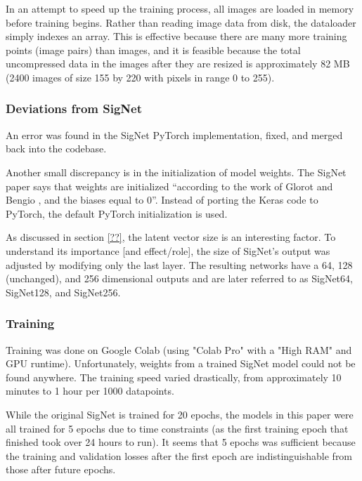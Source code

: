 In an attempt to speed up the training process, all images are loaded in memory before training begins.
Rather than reading image data from disk, the dataloader simply indexes an array.
This is effective because there are many more training points (image pairs) than images, and it is feasible because the total uncompressed data in the images after they are resized is approximately 82 MB (2400 images of size 155 by 220 with pixels in range 0 to 255).

\subsubsection{Deviations from SigNet}
An error was found in the SigNet PyTorch implementation, fixed, and merged back into the codebase.

Another small discrepancy is in the initialization of model weights.
The SigNet paper says that weights are initialized ``according to the work
of Glorot and Bengio \cite{glorot_bengio}, and the biases equal to 0''\cite{sig_net}.
Instead of porting the Keras code to PyTorch, the default PyTorch initialization is used.


As discussed in section \ref{??}, the latent vector size is an interesting factor.
To understand its importance [and effect/role], the size of SigNet's output was adjusted by modifying only the last layer.
The resulting networks have a 64, 128 (unchanged), and 256 dimensional outputs and are later referred to as SigNet64, SigNet128, and SigNet256.

\subsubsection{Training}
Training was done on Google Colab (using "Colab Pro" with a "High RAM" and GPU runtime).
Unfortunately, weights from a trained SigNet model could not be found anywhere.
The training speed varied drastically, from approximately 10 minutes to 1 hour per 1000 datapoints.

While the original SigNet is trained for 20 epochs, the models in this paper were all trained for 5 epochs due to time constraints (as the first training epoch that finished took over 24 hours to run).
It seems that 5 epochs was sufficient because the training and validation losses after the first epoch are indistinguishable from those after future epochs.

